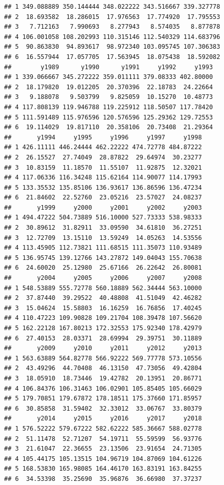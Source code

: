 \documentclass[
]{book}
\begin{document}
\begin{verbatim}
## 1 349.088889 350.144444 348.022222 343.516667 339.327778
## 2  18.693582  18.286015  17.976563  17.774920  17.795553
## 3   7.712163   7.990693   8.277943   8.574035   8.877878
## 4 106.001058 108.202993 110.315146 112.540329 114.683796
## 5  90.863830  94.893617  98.972340 103.095745 107.306383
## 6  16.557944  17.057705  17.563945  18.075438  18.592082
##        y1989      y1990      y1991     y1992     y1993
## 1 339.066667 345.272222 359.011111 379.08333 402.80000
## 2  18.179820  19.012205  20.370396  22.18783  24.22664
## 3   9.188078   9.503799   9.825059  10.15270  10.48773
## 4 117.808139 119.946788 119.225912 118.50507 117.78420
## 5 111.591489 115.976596 120.576596 125.29362 129.72553
## 6  19.114029  19.817110  20.358106  20.73408  21.29364
##       y1994     y1995     y1996     y1997     y1998
## 1 426.11111 446.24444 462.22222 474.72778 484.87222
## 2  26.15527  27.74049  28.87822  29.64974  30.23277
## 3  10.83159  11.18570  11.55107  11.92875  12.32021
## 4 117.06336 116.34248 115.62164 114.90077 114.17993
## 5 133.35532 135.85106 136.93617 136.86596 136.47234
## 6  21.84602  22.52760  23.05216  23.57027  24.08237
##       y1999     y2000     y2001     y2002     y2003
## 1 494.47222 504.73889 516.10000 527.73333 538.98333
## 2  30.89612  31.82911  33.09590  34.61810  36.27251
## 3  12.72709  13.15110  13.59249  14.05263  14.53556
## 4 113.45905 112.73821 111.68515 111.35073 110.93489
## 5 136.95745 139.12766 143.27872 149.04043 155.70638
## 6  24.60020  25.12980  25.67166  26.22642  26.80081
##       y2004     y2005     y2006     y2007     y2008
## 1 548.53889 555.72778 560.18889 562.34444 563.10000
## 2  37.87440  39.29522  40.48808  41.51049  42.46282
## 3  15.04624  15.58803  16.16259  16.76856  17.40245
## 4 110.47223 109.90828 109.21704 108.39478 107.56620
## 5 162.22128 167.80213 172.32553 175.92340 178.42979
## 6  27.40153  28.03371  28.69994  29.39751  30.11889
##       y2009     y2010     y2011     y2012     y2013
## 1 563.63889 564.82778 566.92222 569.77778 573.10556
## 2  43.49296  44.70408  46.13150  47.73056  49.42804
## 3  18.05910  18.73446  19.42782  20.13951  20.86771
## 4 106.84376 106.31463 106.02901 105.85405 105.66029
## 5 179.70851 179.67872 178.18511 175.37660 171.85957
## 6  30.85858  31.59402  32.33012  33.06767  33.80379
##       y2014     y2015     y2016     y2017     y2018
## 1 576.52222 579.67222 582.62222 585.36667 588.02778
## 2  51.11478  52.71207  54.19711  55.59599  56.93776
## 3  21.61047  22.36655  23.13506  23.91654  24.71305
## 4 105.44175 105.13515 104.96719 104.87069 104.61226
## 5 168.53830 165.98085 164.46170 163.83191 163.84255
## 6  34.53398  35.25690  35.96876  36.66980  37.37237
\end{verbatim}
\end{document}
